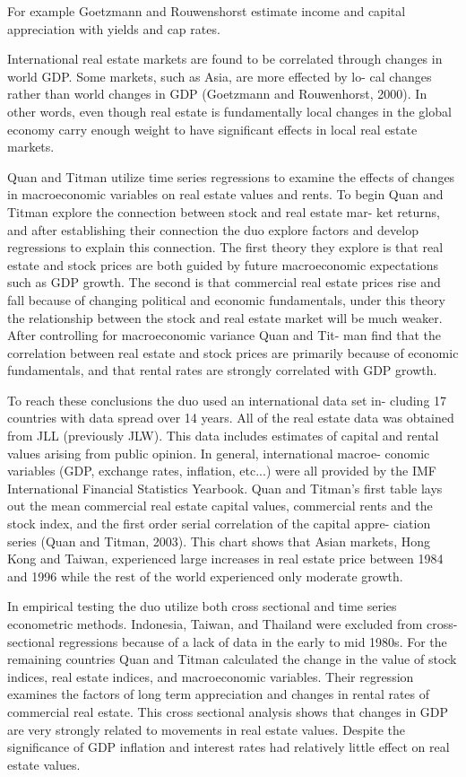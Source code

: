 For example Goetzmann and Rouwenshorst estimate income and capital appreciation with yields and cap rates.

International real estate markets are found to be correlated through changes in world GDP. Some markets, such as Asia, are more effected by lo- cal changes rather than world changes in GDP (Goetzmann and Rouwenhorst, 2000). In other words, even though real estate is fundamentally local changes in the global economy carry enough weight to have significant effects in local real estate markets.

Quan and Titman utilize time series regressions to examine the effects of changes in macroeconomic variables on real estate values and rents. To begin Quan and Titman explore the connection between stock and real estate mar- ket returns, and after establishing their connection the duo explore factors and develop regressions to explain this connection. The first theory they explore is that real estate and stock prices are both guided by future macroeconomic expectations such as GDP growth. The second is that commercial real estate prices rise and fall because of changing political and economic fundamentals, under this theory the relationship between the stock and real estate market will be much weaker. After controlling for macroeconomic variance Quan and Tit- man find that the correlation between real estate and stock prices are primarily because of economic fundamentals, and that rental rates are strongly correlated with GDP growth.

To reach these conclusions the duo used an international data set in- cluding 17 countries with data spread over 14 years. All of the real estate data was obtained from JLL (previously JLW). This data includes estimates of capital and rental values arising from public opinion. In general, international macroe- conomic variables (GDP, exchange rates, inflation, etc...) were all provided by the IMF International Financial Statistics Yearbook.  Quan and Titman’s first table lays out the mean commercial real estate capital values, commercial rents and the stock index, and the first order serial correlation of the capital appre- ciation series (Quan and Titman, 2003). This chart shows that Asian markets, Hong Kong and Taiwan, experienced large increases in real estate price between 1984 and 1996 while the rest of the world experienced only moderate growth.

In empirical testing the duo utilize both cross sectional and time series econometric methods. Indonesia, Taiwan, and Thailand were excluded from cross-sectional regressions because of a lack of data in the early to mid 1980s. For the remaining countries Quan and Titman  calculated  the  change  in  the value of stock indices, real estate indices, and macroeconomic variables. Their regression examines the factors of long term appreciation and changes in rental rates of commercial real estate.  This cross sectional analysis shows that changes in GDP are very strongly related to movements in real estate values. Despite the significance of GDP inflation and interest rates had relatively little effect on real estate values.

